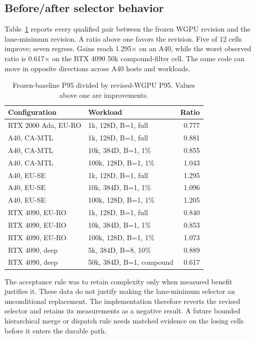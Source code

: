 \documentclass[10pt]{article}
\begin{document}
\subsection{Before/after selector behavior}
Table~\ref{tab:before-after} reports every qualified pair between the frozen WGPU revision and the lane-minimum revision. A ratio above one favors the revision. Five of 12 cells improve; seven regress. Gains reach 1.295$\times$ on an A40, while the worst observed ratio is 0.617$\times$ on the RTX 4090 50k compound-filter cell. The same code can move in opposite directions across A40 hosts and workloads.

\begin{table}[H]
\centering\scriptsize
\caption{Frozen-baseline P95 divided by revised-WGPU P95. Values above one are improvements.}
\label{tab:before-after}
\begin{tabular}{p{.39\linewidth}p{.43\linewidth}r}
\toprule
Configuration & Workload & Ratio \\
\midrule
RTX 2000 Ada, EU-RO & 1k, 128D, B=1, full & 0.777 \\
A40, CA-MTL & 1k, 128D, B=1, full & 0.881 \\
A40, CA-MTL & 10k, 384D, B=1, 1\% & 0.855 \\
A40, CA-MTL & 100k, 128D, B=1, 1\% & 1.043 \\
A40, EU-SE & 1k, 128D, B=1, full & 1.295 \\
A40, EU-SE & 10k, 384D, B=1, 1\% & 1.096 \\
A40, EU-SE & 100k, 128D, B=1, 1\% & 1.205 \\
RTX 4090, EU-RO & 1k, 128D, B=1, full & 0.840 \\
RTX 4090, EU-RO & 10k, 384D, B=1, 1\% & 0.853 \\
RTX 4090, EU-RO & 100k, 128D, B=1, 1\% & 1.073 \\
RTX 4090, deep & 5k, 384D, B=8, 10\% & 0.889 \\
RTX 4090, deep & 50k, 384D, B=1, compound & 0.617 \\
\bottomrule
\end{tabular}
\end{table}

The acceptance rule was to retain complexity only when measured benefit justifies it. These data do not justify making the lane-minimum selector an unconditional replacement. The implementation therefore reverts the revised selector and retains its measurements as a negative result. A future bounded hierarchical merge or dispatch rule needs matched evidence on the losing cells before it enters the durable path.
\end{document}
